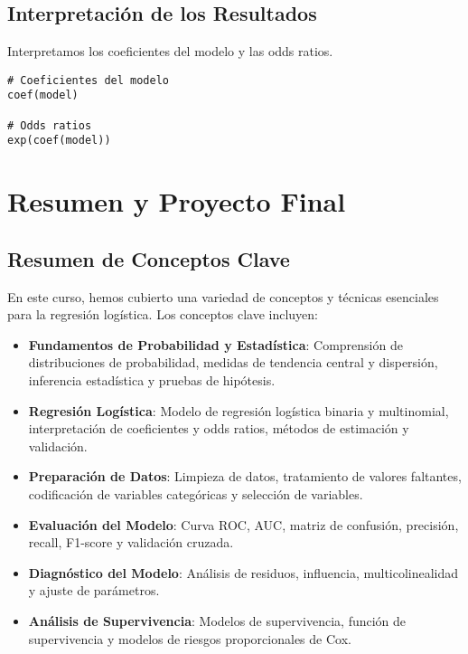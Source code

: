 \documentclass[a4paper]{report} %
\begin{document}
\section{Interpretaci\'on de los Resultados}

Interpretamos los coeficientes del modelo y las odds ratios.

\begin{verbatim}
# Coeficientes del modelo
coef(model)

# Odds ratios
exp(coef(model))
\end{verbatim}


\chapter{Resumen y Proyecto Final}
\section{Resumen de Conceptos Clave}

En este curso, hemos cubierto una variedad de conceptos y t\'ecnicas esenciales para la regresi\'on log\'istica. Los conceptos clave incluyen:

\begin{itemize}
    \item \textbf{Fundamentos de Probabilidad y Estad\'istica}: Comprensi\'on de distribuciones de probabilidad, medidas de tendencia central y dispersi\'on, inferencia estad\'istica y pruebas de hip\'otesis.
    \item \textbf{Regresi\'on Log\'istica}: Modelo de regresi\'on log\'istica binaria y multinomial, interpretaci\'on de coeficientes y odds ratios, m\'etodos de estimaci\'on y validaci\'on.
    \item \textbf{Preparaci\'on de Datos}: Limpieza de datos, tratamiento de valores faltantes, codificaci\'on de variables categ\'oricas y selecci\'on de variables.
    \item \textbf{Evaluaci\'on del Modelo}: Curva ROC, AUC, matriz de confusi\'on, precisi\'on, recall, F1-score y validaci\'on cruzada.
    \item \textbf{Diagn\'ostico del Modelo}: An\'alisis de residuos, influencia, multicolinealidad y ajuste de par\'ametros.
    \item \textbf{An\'alisis de Supervivencia}: Modelos de supervivencia, funci\'on de supervivencia y modelos de riesgos proporcionales de Cox.
\end{itemize}
\end{document}
